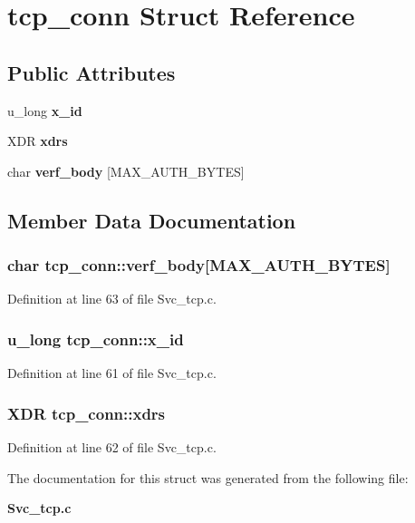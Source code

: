 \section{tcp\_\-conn Struct Reference}
\label{structtcp__conn}
\subsection*{Public Attributes}
\begin{CompactItemize}
\item 
u\_\-long {\bf x\_\-id}
\item 
XDR {\bf xdrs}
\item 
char {\bf verf\_\-body} [MAX\_\-AUTH\_\-BYTES]
\end{CompactItemize}


\subsection{Member Data Documentation}
\subsubsection{\setlength{\rightskip}{0pt plus 5cm}char {\bf tcp\_\-conn::verf\_\-body}[MAX\_\-AUTH\_\-BYTES]}\label{structtcp__conn_o2}




Definition at line 63 of file Svc\_\-tcp.c.
\subsubsection{\setlength{\rightskip}{0pt plus 5cm}u\_\-long {\bf tcp\_\-conn::x\_\-id}}\label{structtcp__conn_o0}




Definition at line 61 of file Svc\_\-tcp.c.
\subsubsection{\setlength{\rightskip}{0pt plus 5cm}XDR {\bf tcp\_\-conn::xdrs}}\label{structtcp__conn_o1}




Definition at line 62 of file Svc\_\-tcp.c.

The documentation for this struct was generated from the following file:\begin{CompactItemize}
\item 
{\bf Svc\_\-tcp.c}\end{CompactItemize}
